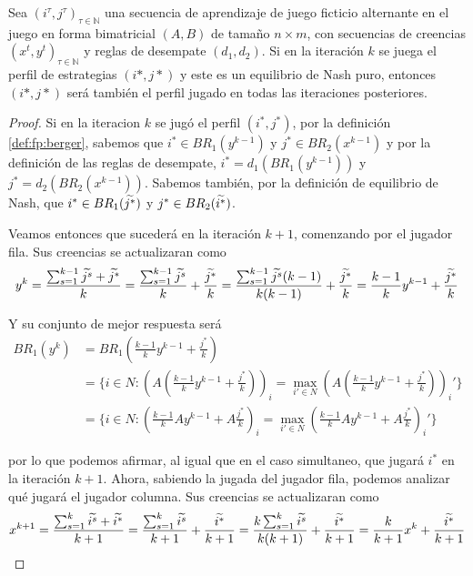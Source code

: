 \begin{theorem}
    Sea $(i^\tau, j^\tau)_{\tau \in \mathbb{N}}$ una secuencia de aprendizaje de juego ficticio alternante en el juego en forma bimatricial $(A, B)$ de tamaño $n \times m$, con secuencias de creencias $(x^t, y^t)_{\tau \in \mathbb{N}}$ y reglas de desempate $(d_1, d_2)$. Si en la iteración $k$ se juega el perfil de estrategias $(i*, j*)$ y este es un equilibrio de Nash puro, entonces $(i*, j*)$ será también el perfil jugado en todas las iteraciones posteriores.
\end{theorem}

\begin{proof}
    Si en la iteracion $k$ se jugó el perfil $(i^*, j^*)$, por la definición \ref{def:fp:berger}, sabemos que $i^* \in BR_1(y^{k-1})$ y $j^* \in BR_2(x^{k-1})$ y por la definición de las reglas de desempate, $i^* = d_1(BR_1(y^{k-1}))$ y $j^* = d_2(BR_2(x^{k-1}))$. Sabemos también, por la definición de equilibrio de Nash, que $i^* \in BR_1(\widetilde{j^*})$ y $j^* \in BR_2(\widetilde{i^*})$.

    Veamos entonces que sucederá en la iteración $k+1$, comenzando por el jugador fila. Sus creencias se actualizaran como
    \[
        y^k = \frac{\sum_{s=1}^{k-1}{\widetilde{j^s}} + \widetilde{j^*}}{k}
            = \frac{\sum_{s=1}^{k-1}{\widetilde{j^s}}}{k} + \frac{\widetilde{j^*}}{k}
            = \frac{\sum_{s=1}^{k-1}{\widetilde{j^s}}(k-1)}{k(k-1)} + \frac{\widetilde{j^*}}{k}
            = \frac{k - 1}{k} y^{k-1} + \frac{\widetilde{j^*}}{k}
    \]

    Y su conjunto de mejor respuesta será
    \begin{align*}
        BR_1(y^k) &= BR_1(\frac{k - 1}{k} y^{k-1} + \frac{j^*}{k}) \\
        &= \{i \in N : (A(\frac{k - 1}{k} y^{k-1} + \frac{j^*}{k}))_i = \max_{i' \in N} (A(\frac{k - 1}{k} y^{k-1} + \frac{j^*}{k}))_i'\}\\
        &= \{i \in N : (\frac{k - 1}{k} Ay^{k-1} + A\frac{j^*}{k})_i = \max_{i' \in N} (\frac{k - 1}{k} Ay^{k-1} + A\frac{j^*}{k})_i'\}
    \end{align*}

    por lo que podemos afirmar, al igual que en el caso simultaneo, que jugará $i^*$ en la iteración $k+1$. Ahora, sabiendo la jugada del jugador fila, podemos analizar qué jugará el jugador columna. Sus creencias se actualizaran como
    \[
        x^{k+1} = \frac{\sum_{s=1}^{k}{\widetilde{i^s}} + \widetilde{i^*}}{k+1}
            = \frac{\sum_{s=1}^{k}{\widetilde{i^s}}}{k+1} + \frac{\widetilde{i^*}}{k+1}
            = \frac{k\sum_{s=1}^{k}{\widetilde{i^s}}}{k(k+1)} + \frac{\widetilde{i^*}}{k+1}
            = \frac{k}{k+1} x^{k} + \frac{\widetilde{i^*}}{k+1}
    \]


\end{proof}
